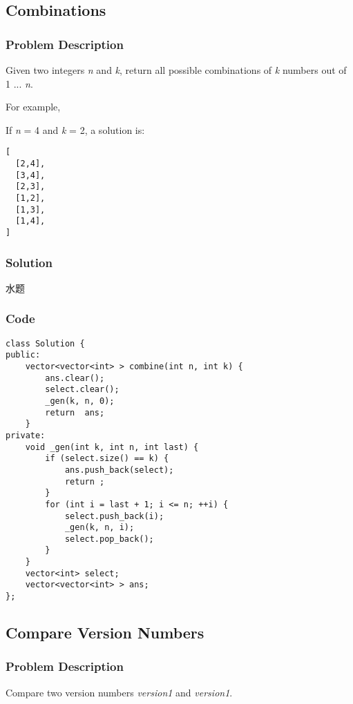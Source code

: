 \documentclass[courier]{article}
\begin{document}
\begin{CJK*}{UTF8}{gkai}
\begin{lstlisting}
\end{lstlisting}


\subsection{ Combinations }

\subsubsection*{Problem Description}
Given two integers \emph{n} and \emph{k}, return all possible combinations of \emph{k} numbers out of 1 ... \emph{n}.

For example,


If \emph{n} = 4 and \emph{k} = 2, a solution is:

\begin{verbatim}
[
  [2,4],
  [3,4],
  [2,3],
  [1,2],
  [1,3],
  [1,4],
]
\end{verbatim}


\subsubsection*{Solution}
水题

\subsubsection*{Code}
\begin{lstlisting}
class Solution {
public:
    vector<vector<int> > combine(int n, int k) {
        ans.clear();
        select.clear();
        _gen(k, n, 0);
        return  ans;
    }
private:
    void _gen(int k, int n, int last) {
        if (select.size() == k) {
            ans.push_back(select);
            return ;
        }
        for (int i = last + 1; i <= n; ++i) {
            select.push_back(i);
            _gen(k, n, i);
            select.pop_back();
        }
    }
    vector<int> select;
    vector<vector<int> > ans;
}; 
\end{lstlisting}


\subsection{ Compare Version Numbers }

\subsubsection*{Problem Description}
Compare two version numbers \emph{version1} and \emph{version1}.



\end{CJK*}
\end{document}
